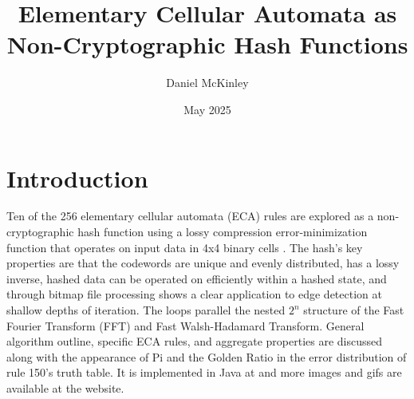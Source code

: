 \documentclass[11pt]{article}
\title{Elementary Cellular Automata as Non-Cryptographic Hash Functions}
\date{May 2025}
\author{Daniel McKinley}
\begin{document}
\maketitle

\section{Introduction}

Ten of the 256 elementary cellular automata (ECA) rules are explored as a non-cryptographic hash function using a lossy compression error-minimization function that operates on input data in 4x4 binary cells \cite{Wolfram}. The hash's key properties are that the codewords are unique and evenly distributed, has a lossy inverse, hashed data can be operated on efficiently within a hashed state, and through bitmap file processing shows a clear application to edge detection at shallow depths of iteration.  The loops parallel the nested $2^n$ structure of the Fast Fourier Transform (FFT) and Fast Walsh-Hadamard Transform. General algorithm outline, specific ECA rules, and aggregate properties are discussed along with the appearance of Pi and the Golden Ratio in the error distribution of rule 150's truth table. It is implemented in Java at \cite{mygit} and more images and gifs are available at the website.\\
\end{document}
